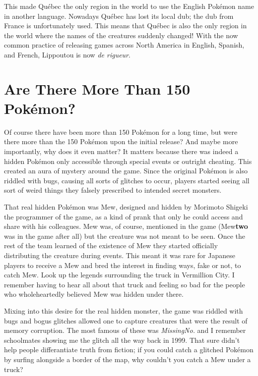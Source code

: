 \documentclass{book}
\begin{document}
This made Québec the only region in the world to use the English Pokémon name in another language. Nowadays Québec has lost its local dub; the dub from France is unfortunately used. This means that Québec is also the only region in the world where the names of the creatures suddenly changed! With the now common practice of releasing games across North America in English, Spanish, and French, Lippoutou is now \emph{de rigueur}.

\FloatBarrier\needspace{10mm}\section*{Are There More Than 150 Pokémon?}\nopagebreak[4]

Of course there have been more than 150 Pokémon for a long time, but were there more than the 150 Pokémon upon the initial release? And maybe more importantly, why does it even matter? It matters because there was indeed a hidden Pokémon only accessible through special events or outright cheating. This created an aura of mystery around the game. Since the original Pokémon is also riddled with bugs, causing all sorts of glitches to occur, players started seeing all sort of weird things they falsely prescribed to intended secret monsters.

That real hidden Pokémon was Mew, designed and hidden by Morimoto Shigeki the programmer of the game, as a kind of prank that only he could access and share with his colleagues. Mew was, of course, mentioned in the game (Mew\textbf{two} was in the game after all) but the creature was not meant to be seen. Once the rest of the team learned of the existence of Mew they started officially distributing the creature during events. This meant it was rare for Japanese players to receive a Mew and bred the interest in finding ways, fake or not, to catch Mew. Look up the legends surrounding the truck in Vermillion City. I remember having to hear all about that truck and feeling so bad for the people who wholeheartedly believed Mew was hidden under there.

Mixing into this desire for the real hidden monster, the game was riddled with bugs and bogus glitches allowed one to capture creatures that were the result of memory corruption. The most famous of these was \emph{MissingNo.} and I remember schoolmates showing me the glitch all the way back in 1999. That sure didn’t help people differantiate truth from fiction; if you could catch a glitched Pokémon by surfing alongside a border of the map, why couldn’t you catch a Mew under a truck?
\end{document}
